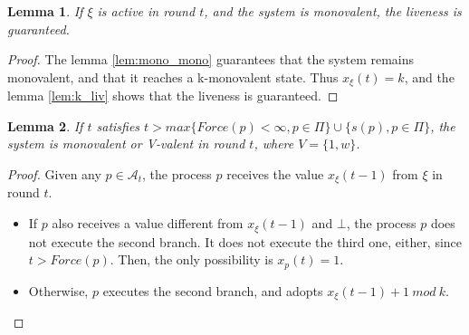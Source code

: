 \documentclass{article}
\newtheorem{lemma}{Lemma}[section]
\begin{document}
\begin{lemma}\label{lem:mono_liv}
	If $\xi$ is active in round $t$, and the system is monovalent, the liveness is guaranteed.
\end{lemma}
\begin{proof}
	The lemma \ref{lem:mono_mono} guarantees that the system remains monovalent, and that it reaches a
	k-monovalent state.
	Thus $x_\xi(t) = k$, and the lemma \ref{lem:k_liv} shows that the liveness is guaranteed.
\end{proof}

\begin{lemma}\label{lem:mono_bi}
	If $t$ satisfies $t > max \{Force(p) < \infty, p \in \Pi\} \cup \{s(p), p \in \Pi\}$,
	the system is monovalent or V-valent in round $t$, where $V = \{1, w\}$.
\end{lemma}
\begin{proof}
	Given any $p \in \mathcal{A}_t$, the process $p$ receives the value $x_\xi(t-1)$ from $\xi$ in round $t$.
	\begin{itemize}
		\item If $p$ also receives a value different from $x_\xi(t-1)$ and $\bot$, the process $p$ does not 
			execute the second branch. It does not execute the third one, either, since $t > Force(p)$.
			Then, the only possibility is $x_p(t) = 1$.
		\item Otherwise, $p$ executes the second branch, and adopts $x_\xi(t-1)+1~mod~k$.
	\end{itemize}
\end{proof}
\end{document}
